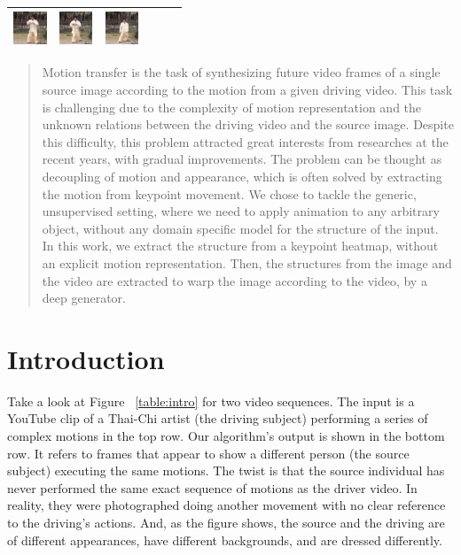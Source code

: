 \documentclass{article}
\begin{document}
\begin{table}[t]
\begin{center}
\begin{small}
\begin{sc}
\begin{tabular}{m{1.0cm}m{1.0cm}m{1.0cm}m{1.0cm}m{1.0cm}m{1.0cm}}
\includegraphics[width=1cm, height=1cm]{images/intro_image/animate_4.png} &
\includegraphics[width=1cm, height=1cm]{images/intro_image/animate_5.png} &
\includegraphics[width=1cm, height=1cm]{images/intro_image/animate_6.png}\\
\bottomrule
\end{tabular}
\end{sc}
\end{small}
\end{center}
\vskip -0.1in
\end{table}

\begin{abstract}
Motion transfer is the task of synthesizing future video frames of a single
source image according to the motion from a given driving video.
This task is challenging due to the complexity of motion representation
and the unknown relations between the driving video and the source image.
Despite this difficulty, this problem attracted great interests from
researches at the recent years, with gradual improvements. The
problem can be thought as decoupling of motion and appearance, which is
often solved by extracting the motion from keypoint movement.
We chose to tackle the generic, unsupervised setting, where we need to apply
animation to any arbitrary object, without any domain specific model for the
structure of the input.
In this work, we extract the structure from a keypoint heatmap, without an
explicit motion representation. Then, the structures from the image and the
video are extracted to warp the image according to the video, by a deep
generator.
\end{abstract}

\section{Introduction}
Take a look at Figure ~\ref{table:intro} for two video sequences. The input
is a YouTube clip of a Thai-Chi artist (the driving subject) performing a
series of complex motions in the top row. Our algorithm's output is shown in
the bottom row. It refers to frames that appear to show a different person
(the source subject) executing the same motions. The twist is that the
source individual has never performed the same exact sequence of motions as
the driver video. In reality, they were photographed doing another movement
with no clear reference to the driving's actions.
And, as the figure shows, the source and the driving are of different
appearances, have different backgrounds, and are dressed differently.
\end{document}
